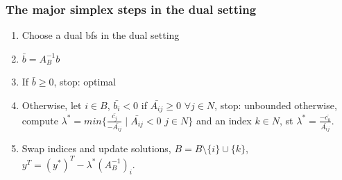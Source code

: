 \documentclass[main]{subfiles}
\begin{document}
\subsubsection{The major simplex steps in the dual setting}
\begin{enumerate}
\item Choose a dual bfs in the dual setting
\item $\bar{b} = A^{-1}_B b$
\item If $\bar{b} \geq 0$, stop: optimal
\item Otherwise, let $i \in B$, $\bar{b_i} < 0$
\subitem if $\bar{A_{ij}} \geq 0$ $\forall j \in N$, stop: unbounded
\subitem otherwise, compute $\lambda^* = min \{\frac{\bar{c_j}}{-\bar{A_{ij}}}
\mid \bar{A_{ij}} < 0$ $j \in N \}$ and an index $k \in N$, st $\lambda^* =
\frac{-\bar{c_k}}{\bar{A_{ij}}}$.
\item Swap indices and update solutions, $B = B\setminus \{i\} \cup \{k\}$, 
$y^T = (y^*)^T - \lambda^* (A^{-1}_B)_i$.
\end{enumerate}
\end{document}
